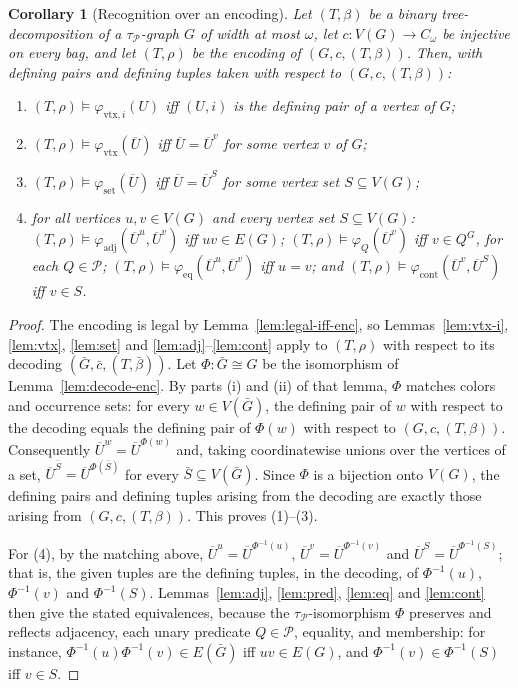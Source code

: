 \documentclass[11pt]{article}
\newtheorem{corollary}[theorem]{Corollary}
\theoremstyle{definition}
\newcommand{\vtx}{\mathrm{vtx}}
\newcommand{\set}{\mathrm{set}}
\newcommand{\adj}{\mathrm{adj}}
\newcommand{\Pred}{\mathcal P}
\newcommand{\eq}{\mathrm{eq}}
\newcommand{\cont}{\mathrm{cont}}
\newcommand{\tuple}[1]{\overline{#1}}
\begin{document}
\begin{corollary}[Recognition over an encoding]\label{cor:recognition-enc}
Let \((T,\beta)\) be a binary tree-decomposition of a \(\tau_{\Pred}\)-graph
\(G\) of width at most \(\omega\), let \(c:V(G)\to C_\omega\) be injective on
every bag, and let \((T,\rho)\) be the encoding of \((G,c,(T,\beta))\).  Then,
with defining pairs and defining tuples taken with respect to
\((G,c,(T,\beta))\):
\begin{enumerate}[label=\textup{(\arabic*)}]
  \item \((T,\rho)\models\varphi_{\vtx,i}(U)\) iff \((U,i)\) is the defining
    pair of a vertex of \(G\);
  \item \((T,\rho)\models\varphi_{\vtx}(\tuple U)\) iff
    \(\tuple U=\tuple U^v\) for some vertex \(v\) of \(G\);
  \item \((T,\rho)\models\varphi_{\set}(\tuple U)\) iff
    \(\tuple U=\tuple U^S\) for some vertex set \(S\subseteq V(G)\);
  \item for all vertices \(u,v\in V(G)\) and every vertex set
    \(S\subseteq V(G)\):
    \((T,\rho)\models\varphi_{\adj}(\tuple U^u,\tuple U^v)\) iff
    \(uv\in E(G)\);
    \((T,\rho)\models\varphi_Q(\tuple U^v)\) iff \(v\in Q^G\), for each
    \(Q\in\Pred\);
    \((T,\rho)\models\varphi_{\eq}(\tuple U^u,\tuple U^v)\) iff \(u=v\); and
    \((T,\rho)\models\varphi_{\cont}(\tuple U^v,\tuple U^S)\) iff \(v\in S\).
\end{enumerate}
\end{corollary}

\begin{proof}
The encoding is legal by Lemma~\ref{lem:legal-iff-enc}, so
Lemmas~\ref{lem:vtx-i}, \ref{lem:vtx}, \ref{lem:set} and
\ref{lem:adj}--\ref{lem:cont} apply to \((T,\rho)\) with respect to its
decoding \((\bar G,\bar c,(T,\bar\beta))\).  Let \(\Phi:\bar G\cong G\) be the
isomorphism of Lemma~\ref{lem:decode-enc}.  By parts (i) and (ii) of that
lemma, \(\Phi\) matches colors and occurrence sets: for every
\(w\in V(\bar G)\), the defining pair of \(w\) with respect to the decoding
equals the defining pair of \(\Phi(w)\) with respect to \((G,c,(T,\beta))\).
Consequently \(\tuple U^w=\tuple U^{\Phi(w)}\) and, taking coordinatewise
unions over the vertices of a set,
\(\tuple U^{\bar S}=\tuple U^{\Phi(\bar S)}\) for every
\(\bar S\subseteq V(\bar G)\).  Since \(\Phi\) is a bijection onto \(V(G)\),
the defining pairs and defining tuples arising from the decoding are exactly
those arising from \((G,c,(T,\beta))\).  This proves (1)--(3).

For (4), by the matching above,
\(\tuple U^u=\tuple U^{\Phi^{-1}(u)}\), \(\tuple U^v=\tuple U^{\Phi^{-1}(v)}\)
and \(\tuple U^S=\tuple U^{\Phi^{-1}(S)}\); that is, the given tuples are the
defining tuples, in the decoding, of \(\Phi^{-1}(u)\), \(\Phi^{-1}(v)\) and
\(\Phi^{-1}(S)\).  Lemmas~\ref{lem:adj}, \ref{lem:pred}, \ref{lem:eq} and
\ref{lem:cont} then give the stated equivalences, because the
\(\tau_{\Pred}\)-isomorphism \(\Phi\) preserves and reflects adjacency, each
unary predicate \(Q\in\Pred\), equality, and membership: for instance,
\(\Phi^{-1}(u)\Phi^{-1}(v)\in E(\bar G)\) iff \(uv\in E(G)\), and
\(\Phi^{-1}(v)\in\Phi^{-1}(S)\) iff \(v\in S\).
\end{proof}
\end{document}
